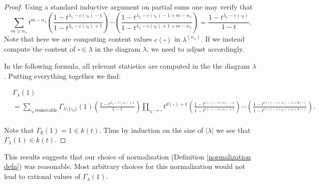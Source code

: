 \documentclass[12pt,reqno]{amsart}
\theoremstyle{definition}
\begin{document}
\begin{proof}
Using a standard inductive argument on partial sums one may verify that
$$ \sum_{m \geq n_{\lambda}} t^{m-n_{\lambda}} \left(\frac{1-t^{\lambda_1-c(\square_0)-1}}{1-t^{\lambda_1-c(\square_0)+1}}\right)\cdots \left(\frac{1-t^{\lambda_1-c(\square_0)-1+m-n_{\lambda}}}{1-t^{\lambda_1-c(\square_0)+1+m-n_{\lambda}}}\right) = \frac{1-t^{\lambda_1-c(\square_0)}}{1-t}.$$ Note that here we are computing content values $c(\square)$ in $\lambda^{(n_{\lambda})}.$ If we instead compute the content of $\square \in \lambda$ in the diagram $\lambda$, we need to adjust accordingly. 

In the following formula, all relevant statistics are computed in the the diagram $\lambda$. Putting everything together we find:

\begin{align*}
    &\Gamma_{\lambda}(1) \\
    &= \sum_{\square_0~ \text{removable}} \Gamma_{\lambda \setminus \{\square_0\}}(1) \left( \frac{1-t^{\lambda_1-c(\square_0)+1}}{1-t} \right)\prod_{\square_0 \rightarrow \square} t^{d(\square)+1}\left(\frac{1-t^{c(\square)-c(\square_0)-1}}{1-t^{c(\square)-c(\square_0)+1}}\right) \cdots \left(\frac{1-t^{c(\square)-c(\square_0)-1+d(\square)}}{1-t^{c(\square)-c(\square_0)+1+d(\square)}}\right).\\
\end{align*}

Note that $\Gamma_{\emptyset}(1) = 1 \in k(t).$ Thus by induction on the size of $|\lambda|$ we see that $\Gamma_{\lambda}(1) \in k(t).$

\end{proof}

This results suggests that our choice of normalization (Definition \ref{normalization defn}) was reasonable. Most arbitrary choices for this normalization would not lead to rational values of $\Gamma_{\lambda}(1).$ 
\end{document}
